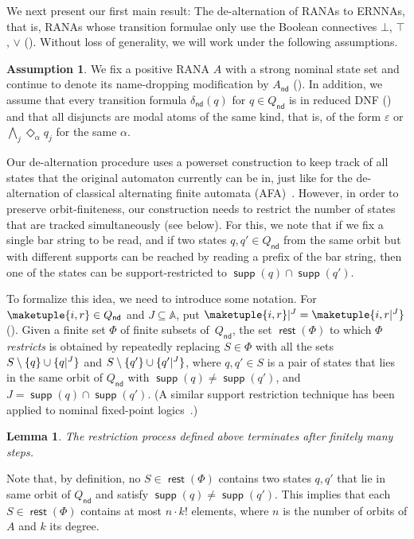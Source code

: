 \documentclass[10pt,a4paper]{amsart}
\newtheorem{lem}[theo]{Lemma}
\theoremstyle{definition}
\newtheorem{assumption}[theo]{Assumption}
\newcommand\restr[2]{{%
  \left.\kern-\nulldelimiterspace %
  #1 %
  \littletaller %
  \right|{}^{#2} %
}}
\newcommand{\littletaller}{\mathchoice{\vphantom{\big|}}{}{}{}}
\newcommand{\seq}{\subseteq}
\newcommand{\At}{\mathds{A}}
\newcommand{\op}[1]{\operatorname{\mathsf{#1}}}
\newcommand{\nd}{\op{nd}}
\newcommand{\rest}{\op{rest}}
\DeclareMathOperator{\supp}{\mathsf{supp}}
\newcommand{\set}[1]{\{#1\}}
\let\originalleft\left
\let\originalright\right
\renewcommand{\left}{\mathopen{}\mathclose\bgroup\originalleft}
\renewcommand{\right}{\aftergroup\egroup\originalright}
\begin{document}
We next present our first main result: The de-alternation of RANAs to
ERNNAs, that is, RANAs whose transition formulae only use the Boolean connectives $\bot$, $\top$, $\vee$ ().
Without loss of generality, we will work under the following
assumptions.

\begin{assumption}\label{ass:ranalookslike}
  We fix a positive RANA $A$ with a strong nominal state set and continue to denote its name-dropping modification by $A_{\nd}$ ().
  In addition, we assume that every transition formula $\delta_{\nd}(q)$ for $q \in Q_{\nd}$ is in reduced DNF () and that all disjuncts are
  modal atoms of the same kind, that is, of the form $\varepsilon$ or $\bigwedge_j \Diamond_{\alpha} q_j$ for the same $\alpha$.
\end{assumption}



Our de-alternation procedure uses a powerset construction to keep track of all states that the original automaton currently can be in,
just like for the de-alternation of classical alternating finite automata (AFA)~\cite{fjy90}.
However, in order to preserve orbit-finiteness, our construction needs to restrict the number of states that are tracked simultaneously (see  below).
For this, we note that if we fix a single bar string to be read, and if two states $q, q' \in Q_{\nd}$ from the same orbit but with different
supports can be reached by reading a prefix of the bar string, then one of the states can be support-restricted to $\supp(q) \cap \supp(q')$.

To formalize this idea, we need to introduce some notation. For $\maketuple{i, r} \in Q_{\nd}$ and $J\seq \At$, put
$\restr{\maketuple{i, r}}{J}=\maketuple{i, \restr{r}{J}}$ ().
Given a finite set $\Phi$ of finite subsets of~$Q_{\nd}$, the set
$\rest(\Phi)$ to which $\Phi$ \emph{restricts} is obtained by
repeatedly replacing $S \in \Phi$ with all the sets
$S \setminus \set{q} \cup \set{\restr{q}{J}}$ and
$S\setminus \set{q'} \cup \set{\restr{q'}{J}}$, where $q, q' \in S$ is
a pair of states that lies in the same orbit of $Q_{\nd}$ with
$\supp(q)\neq \supp(q')$, and $J=\supp(q)\cap \supp(q')$. (A similar
support restriction technique has been applied to nominal fixed-point logics~\cite{hms21}.)

\begin{lem}\label{lem:rest-termination}
  The restriction process defined above terminates after finitely many steps. 
\end{lem}
\noindent
Note that, by definition, no $S \in \rest(\Phi)$ contains two states $q, q'$ that lie in same orbit of $Q_{\nd}$ and satisfy $\supp(q) \neq \supp(q')$.
This implies that each $S \in \rest(\Phi)$ contains at most $n \cdot k!$ elements, where $n$ is the number of orbits of $A$ and $k$ its degree.
\end{document}

